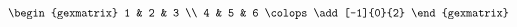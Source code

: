 \documentclass{article}
\begin{document}
\begin{equation*}
    \begin{gexmatrix}
        1 & 2 & 3 \\
        4 & 5 & 6
        \colops
        \add[-1]{0}{2}
    \end{gexmatrix}
\end{equation*}
\end{document}
